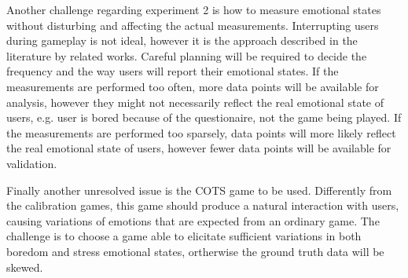 Another challenge regarding experiment 2 is how to measure emotional states without disturbing and affecting the actual measurements. Interrupting users during gameplay is not ideal, however it is the approach described in the literature by related works. Careful planning will be required to decide the frequency and the way users will report their emotional states. If the measurements are performed too often, more data points will be available for analysis, however they might not necessarily reflect the real emotional state of users, e.g. user is bored because of the questionaire, not the game being played. If the measurements are performed too sparsely, data points will more likely reflect the real emotional state of users, however fewer data points will be available for validation.


Finally another unresolved issue is the COTS game to be used. Differently from the calibration games, this game should produce a natural interaction with users, causing variations of emotions that are expected from an ordinary game. The challenge is to choose a game able to elicitate sufficient variations in both boredom and stress emotional states, ortherwise the ground truth data will be skewed.

